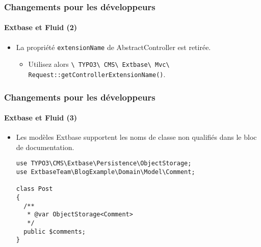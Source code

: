 \begin{frame}[fragile]
	\frametitle{Changements pour les développeurs}
	\framesubtitle{Extbase et Fluid (2)}

	\begin{itemize}
		\item La propriété \texttt{extensionName} de AbstractController est retirée.

			\begin{itemize}\smaller
				\item[\ding{228}] Utilisez alors \texttt{\textbackslash
					TYPO3\textbackslash
					CMS\textbackslash
					Extbase\textbackslash
					Mvc\textbackslash
					Request::getControllerExtensionName()}.
			\end{itemize}\normalsize

	\end{itemize}

\end{frame}


\begin{frame}[fragile]
	\frametitle{Changements pour les développeurs}
	\framesubtitle{Extbase et Fluid (3)}

	\lstset{basicstyle=\tiny\ttfamily}

	\begin{itemize}
		\item Les modèles Extbase supportent les noms de classe non qualifiés dans le bloc de documentation.

\begin{lstlisting}
use TYPO3\CMS\Extbase\Persistence\ObjectStorage;
use ExtbaseTeam\BlogExample\Domain\Model\Comment;

class Post
{
  /**
   * @var ObjectStorage<Comment>
   */
  public $comments;
}
\end{lstlisting}

	\end{itemize}

\end{frame}



